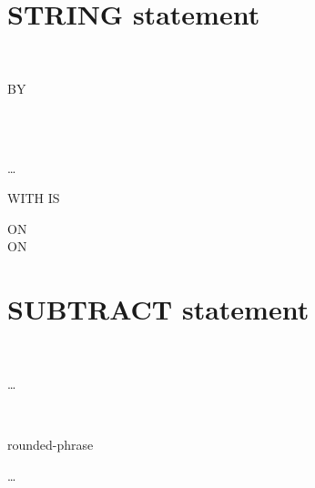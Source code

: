 \ {}\newline
{}

\ {}\newline
{}

\section{STRING statement}

\begin{1=}
  \begin{1=}
    \identifier \\
    \literal
  \end{1=}

  \begin{0-1}
     BY
    \begin{1=}
       \\
      \identifier \\
      \literal
    \end{1=}
  \end{0-1}
\end{1=} \ldots\ {}
 \identifier

\begin{0-1}
  WITH  IS \identifier
\end{0-1}

\begin{0+}
  ON  \imperativestatement \\
   ON  \imperativestatement
\end{0+}

\section{SUBTRACT statement}

\begin{1=}
  \identifier \\
  \literal
\end{1=} \ldots
{}
\begin{1=}
  \begin{1=}
    \identifier \\
    \literal
  \end{1=}
  \begin{0-1}
    rounded-phrase
  \end{0-1}
\end{1=} \ldots

